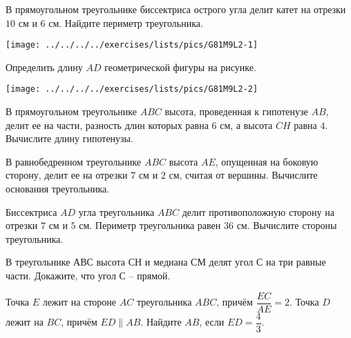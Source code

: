 \begin{class}[number=2]
	\begin{listofex}
		\item 
		\begin{minipage}[t]{\bodywidth}
			В прямоугольном треугольнике биссектриса острого угла делит катет на отрезки \( 10 \) см и \( 6 \) см. Найдите периметр треугольника.
		\end{minipage}
		\hspace{0.02\linewidth}
		\begin{minipage}[t]{\picwidth}
			\texttt{[image: ../../../../exercises/lists/pics/G81M9L2-1]}
		\end{minipage}
	\item 
	\begin{minipage}[t]{\bodywidth}
		Определить длину \( AD\) геометрической фигуры на рисунке.
	\end{minipage}
	\hspace{0.02\linewidth}
	\begin{minipage}[t]{\picwidth}
		\texttt{[image: ../../../../exercises/lists/pics/G81M9L2-2]}
	\end{minipage}
	\item В прямоугольном треугольнике \( ABC \) высота, проведенная к гипотенузе \( AB \), делит ее на части, разность длин которых равна \( 6 \) см, а высота \( CH \) равна \( 4 \). Вычислите длину гипотенузы.
	\item В равнобедренном треугольнике \( ABC \) высота \( AE \), опущенная на боковую сторону, делит ее на отрезки \( 7 \) см и \( 2 \) см, считая от вершины. Вычислите основания треугольника.
	\item Биссектриса \( AD \) угла треугольника \( ABC \) делит противоположную сторону на отрезки \( 7 \) см и \( 5 \) см. Периметр треугольника равен \( 36 \) см. Вычислите стороны треугольника.
	\item В треугольнике АВС высота \( СН \) и медиана \( СМ \) делят угол \( С \) на три равные части. Докажите, что угол \( С \) – прямой.
	\item Точка \( E \) лежит на стороне \( AC \) треугольника \( ABC \), причём \( \dfrac{EC}{AE} = 2 \). Точка \( D \) лежит на \( BC \), причём \( ED\parallel AB \). Найдите \( AB \), если \( ED = \dfrac{4}{3} \).
	\item 
	\begin{minipage}[t]{\bodywidth}

\end{minipage}
\end{listofex}
\end{class}
